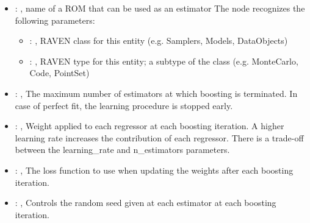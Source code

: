 \begin{itemize}
    \item {}: , 
      name of a ROM that can be used as an estimator
      The  node recognizes the following parameters:
        \begin{itemize}
          \item {}: , 
            RAVEN class for this entity (e.g. Samplers, Models, DataObjects)
          \item {}: , 
            RAVEN type for this entity; a subtype of the class (e.g. MonteCarlo, Code, PointSet)
      \end{itemize}

    \item {}: , 
      The maximum number of estimators at which boosting is
      terminated. In case of perfect fit, the learning procedure is
      stopped early.

    \item {}: , 
      Weight applied to each regressor at each boosting iteration.
      A higher learning rate increases the contribution of each regressor.
      There is a trade-off between the learning\_rate and n\_estimators
      parameters.

    \item {}: , 
      The loss function to use when updating the weights after each
      boosting iteration.

    \item {}: , 
      Controls the random seed given at each estimator at each
      boosting iteration.
  \end{itemize}
